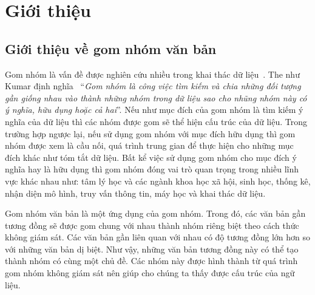 \chapter{Giới thiệu}
\label{Chapter1}

\section{Giới thiệu về gom nhóm văn bản}

Gom nhóm là vấn đề được nghiên cứu nhiều trong khai thác dữ liệu~\cite{Jain-Dubes, Jardin-Rijsbergen,Ji-Xu,Jolliffee}.
The như Kumar định nghĩa~\cite{Vipin-Kumar} ``\textit{Gom nhóm là công việc tìm kiếm và chia những đối tượng gần giống nhau vào thành những nhóm trong dữ liệu sao cho nhũng nhóm này có ý nghĩa, hữu dụng hoặc cả hai}''. %
Nếu như mục đích của gom nhóm là tìm kiếm ý nghĩa của dữ liệu thì các nhóm được gom sẽ thể hiện cấu trúc của dữ liệu.
Trong trường hợp ngược lại, nếu sử dụng gom nhóm với mục đích hữu dụng thì gom nhóm được xem là cầu nối, quá trình trung gian để thực hiện cho những mục đích khác như tóm tắt dữ liệu.
Bất kể việc sử dụng gom nhóm cho mục đích ý nghĩa hay là hữu dụng thì gom nhóm đóng vai trò quan trọng trong nhiều lĩnh vực khác nhau như: tâm lý học và các ngành khoa học xã hội, sinh học, thống kê, nhận diện mô hình, truy vấn thông tin, máy học và khai thác dữ liệu.

Gom nhóm văn bản là một ứng dụng của gom nhóm.
Trong đó, các văn bản gần tương đồng sẽ được gom chung với nhau thành nhóm riêng biệt theo cách thức không giám sát.
Các văn bản gần liên quan với nhau có độ tương đồng lớn hơn so với những văn bản dị biệt.
Như vậy, những văn bản tương đồng này có thể tạo thành nhóm có cùng một chủ đề.
Các nhóm này được hình thành từ quá trình gom nhóm không giám sát nên giúp cho chúng ta thấy được cấu trúc của ngữ liệu.

